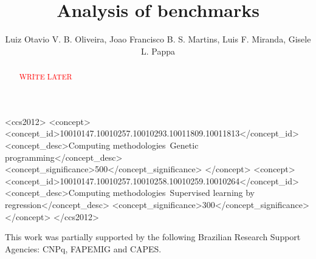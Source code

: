\documentclass[sigconf, table]{acmart}
\begin{document}
	
	\title{Analysis of benchmarks} 
	
	
	\author{Luiz Otavio V. B. Oliveira, Joao Francisco B. S. Martins, Luis F. Miranda, Gisele L. Pappa}
	
	\renewcommand{\shortauthors}{Oliveira et al.}
	
	\begin{abstract}
		
\textcolor{red}{WRITE LATER}
		
	\end{abstract}
	
	\begin{CCSXML}
		<ccs2012>
		<concept>
		<concept_id>10010147.10010257.10010293.10011809.10011813</concept_id>
		<concept_desc>Computing methodologies~Genetic programming</concept_desc>
		<concept_significance>500</concept_significance>
		</concept>
		<concept>
		<concept_id>10010147.10010257.10010258.10010259.10010264</concept_id>
		<concept_desc>Computing methodologies~Supervised learning by regression</concept_desc>
		<concept_significance>300</concept_significance>
		</concept>
		</ccs2012>
	\end{CCSXML}
	
	
	
	
	\maketitle
	
	
	
	
	
	
	
	\begin{acks}
		This work was partially supported by the following Brazilian Research Support Agencies: CNPq, FAPEMIG and CAPES. 
	\end{acks}
	
	
	
	
\end{document}

